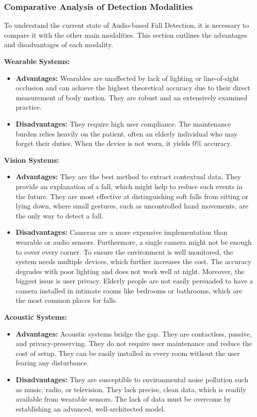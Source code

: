 \documentclass[11pt, a4paper, twoside]{article}
\begin{document}



\subsubsection{Comparative Analysis of Detection Modalities}
To understand the current state of Audio-based Fall Detection, it is necessary to compare it with the other main modalities. This section outlines the advantages and disadvantages of each modality.

\textbf{Wearable Systems:}
\begin{itemize}
    \item \textbf{Advantages:} Wearables are unaffected by lack of lighting or line-of-sight occlusion and can achieve the highest theoretical accuracy due to their direct measurement of body motion. They are robust and an extensively examined practice.
    \item \textbf{Disadvantages:} They require high user compliance. The maintenance burden relies heavily on the patient, often an elderly individual who may forget their duties. When the device is not worn, it yields 0\% accuracy.
\end{itemize}

\textbf{Vision Systems:}
\begin{itemize}
    \item \textbf{Advantages:} They are the best method to extract contextual data. They provide an explanation of a fall, which might help to reduce such events in the future. They are most effective at distinguishing soft falls from sitting or lying down, where small gestures, such as uncontrolled hand movements, are the only way to detect a fall.
    \item \textbf{Disadvantages:} Cameras are a more expensive implementation than wearable or audio sensors. Furthermore, a single camera might not be enough to cover every corner. To ensure the environment is well monitored, the system needs multiple devices, which further increases the cost. The accuracy degrades with poor lighting and does not work well at night. Moreover, the biggest issue is user privacy. Elderly people are not easily persuaded to have a camera installed in intimate rooms like bedrooms or bathrooms, which are the most common places for falls.
\end{itemize}

\textbf{Acoustic Systems:}
\begin{itemize}
    \item \textbf{Advantages:} Acoustic systems bridge the gap. They are contactless, passive, and privacy-preserving. They do not require user maintenance and reduce the cost of setup. They can be easily installed in every room without the user fearing any disturbance.
    \item \textbf{Disadvantages:} They are susceptible to environmental noise pollution such as music, radio, or television. They lack precise, clean data, which is readily available from wearable sensors. The lack of data must be overcome by establishing an advanced, well-architected model.
\end{itemize}
\end{document}
